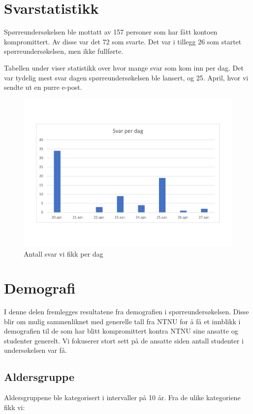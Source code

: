 \section{Svarstatistikk}
Spørreundersøkelsen ble mottatt av 157 personer som har fått kontoen kompromittert. Av disse var det 72 som svarte. Det var i tillegg 26 som startet spørreundersøkelsen, men ikke fullførte. 

Tabellen under viser statistikk over hvor mange svar som kom inn per dag. Det var tydelig mest svar dagen spørreundersøkelsen ble lansert, og 25. April, hvor vi sendte ut en purre e-post. 
\begin{figure}[H]
    \centering
    \includegraphics[scale=0.5, clip, trim=1cm 3cm 0cm 3cm]{case_2/bilder/spss/svar_per_dag.pdf}
    \caption[Svar per dag]{Antall svar vi fikk per dag}
    \label{fig:boks}
\end{figure}


\section{Demografi}
I denne delen fremlegges resultatene fra demografien i spørreundersøkelsen. Disse blir om mulig sammenliknet med generelle tall fra NTNU for å få et innblikk i demografien til de som har blitt kompromittert kontra NTNU sine ansatte og studenter generelt. Vi fokuserer stort sett på de ansatte siden antall studenter i undersøkelsen var få.

\subsection{Aldersgruppe}
Aldersgruppene ble kategorisert i intervaller på 10 år. Fra de ulike kategoriene fikk vi:

